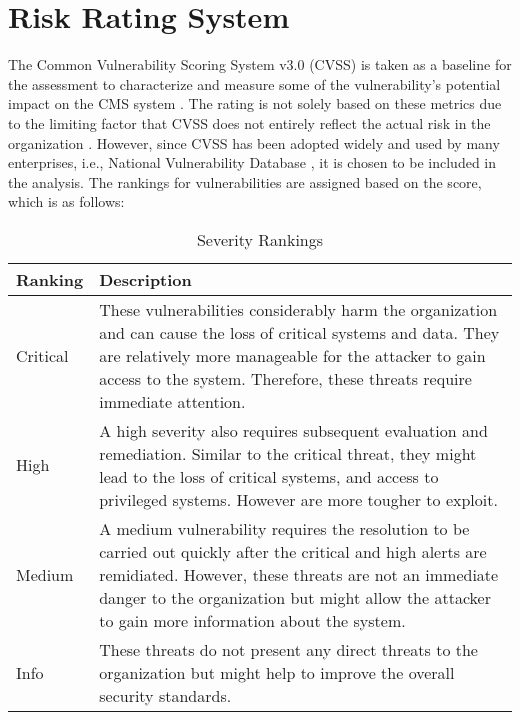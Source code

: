\chapter{Risk Rating System}

The Common Vulnerability Scoring System v3.0 (CVSS) is taken as a baseline for the assessment to characterize and measure some of the vulnerability's potential impact on the CMS system \citep[p.~516]{cvss}. 
The rating is not solely based on these metrics due to the limiting factor that CVSS does not entirely reflect the actual risk in the organization \citep[p.~7]{limitations_cvss}. However, since CVSS has been adopted widely and used by many enterprises, i.e., National Vulnerability Database \citep{nist}, it is chosen to be included in the analysis. 
The rankings for vulnerabilities are assigned based on the score, which is as follows:


\begingroup
\centering
\setlength{\tabcolsep}{6.5pt} %
\renewcommand{\arraystretch}{1.8} %
\begin{longtable}{ |p{5cm}| p{10cm} |}
\caption{Severity Rankings}
    \label{table:spoofing}
\hline
\rowcolor{grey!15}
\textbf{Ranking}  & \textbf{Description}\\
\hline
\cellcolor{red!95} Critical  & These vulnerabilities considerably harm the organization and can cause the loss of critical systems and data. They are relatively more manageable for the attacker to gain access to the system. Therefore, these threats require immediate attention.\\
\hline
\cellcolor{red!70} High  &  A high severity also requires subsequent evaluation and remediation. Similar to the critical threat, they might lead to the loss of critical systems, and access to privileged systems. However are more tougher to exploit.\\
\hline
\hline
\cellcolor{yellow!95} Medium &  A medium vulnerability requires the resolution to be carried out quickly after the critical and high alerts are remidiated. However, these threats are not an immediate danger to the organization but might allow the attacker to gain more information about the system.\\
\hline
\cellcolor{grey!55} Info  &  These threats do not present any direct threats to the organization but might help to improve the overall security standards.\\
\hline
\end{longtable}
\endgroup